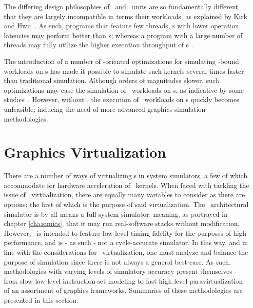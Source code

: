 The differing design philosophies of \dvttermcpu\ and \dvttermgpu\ units are so fundamentally different that they are largely incompatible in terms their workloads, as explained by Kirk and Hwu~.
As such, programs that feature few threads, \dvttermcpu s with lower operation latencies may perform better than \dvttermgpu s; whereas a program with a large number of threads may fully utilize the higher execution throughput of \dvttermgpu s~.

The introduction of a number of \dvttermcpu -oriented optimizations for simulating \dvttermgpu -bound workloads on \dvttermcpu s has made it possible to simulate such kernels several times faster than traditional simulation.
Although orders of magnitudes slower, such optimizations may ease the simulation of \dvttermgpu\ workloads on \dvttermcpu s, as indicative by some studies~.
However, without \dvttermdirectvirtualization , the execution of \dvttermgpu\ workloads on \dvttermcpu s quickly becomes unfeasible; inducing the need of more advanced graphics simulation methodologies.

\section{Graphics Virtualization}
\label{sec:backgroundandrelatedwork_graphicsvirtualization}
There are a number of ways of virtualizing \dvttermgpu s in system simulators, a few of which accommodate for hardware acceleration of \dvttermgpu\ kernels.
When faced with tackling the issue of \dvttermgpu\ virtualization, there are equally many variables to consider as there are options; the first of which is the purpose of said virtualization.
The \dvttermsimics\ architectural simulator is by all means a full-system simulator; meaning, as portrayed in chapter \ref{cha:simics}, that it may run real-software stacks without modification.
However, \dvttermsimics\ is intended to feature low level timing fidelity for the purposes of high performance, and is - as such - not a cycle-accurate simulator.
In this way, and in line with the considerations for \dvttermgpu\ virtualization, one must analyze and balance the purpose of simulation since there is not always a general best-case.
As such, methodologies with varying levels of simulatory accuracy present themselves - from slow low-level instruction set modeling to fast high level paravirtualization of an assortment of graphics frameworks.
Summaries of these methodologies are presented in this section.

